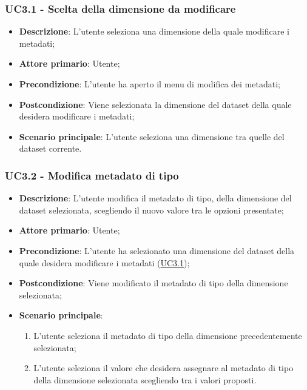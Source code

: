 \newpage

\subsubsection{UC3.1 - Scelta della dimensione da modificare}
\label{ssub:uc3.1}

\begin{itemize}
    \item \textbf{Descrizione}: L’utente seleziona una dimensione della quale modificare i metadati;
    \item \textbf{Attore primario}: Utente;

    \item \textbf{Precondizione}:   L'utente ha aperto il menu di modifica dei metadati;
    \item \textbf{Postcondizione}:  Viene selezionata la dimensione del dataset della quale desidera modificare i 
    metadati;

	\item \textbf{Scenario principale}: L'utente seleziona una dimensione tra quelle del dataset corrente.
\end{itemize}

\subsubsection{UC3.2 - Modifica metadato di tipo}
\label{ssub:uc3.2}

\begin{itemize}
    \item \textbf{Descrizione}: L’utente modifica il metadato di tipo, della dimensione del dataset selezionata, 
    scegliendo il nuovo valore tra le opzioni presentate;
	
    \item \textbf{Attore primario}: Utente;
    
    \item \textbf{Precondizione}:   L'utente ha selezionato una dimensione del dataset della quale desidera modificare 
    i metadati (\hyperref[ssub:uc3.1]{UC3.1});
    \item \textbf{Postcondizione}:  Viene modificato il metadato di tipo della dimensione selezionata;

	\item \textbf{Scenario principale}:
	\begin{enumerate}
        \item L'utente seleziona il metadato di tipo della dimensione precedentemente selezionata;
        \item L'utente seleziona il valore che desidera assegnare al metadato di tipo della dimensione selezionata 
        scegliendo tra i valori proposti.
    \end{enumerate}
    
   
\end{itemize}


